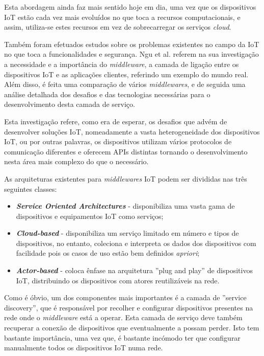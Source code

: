 Esta abordagem ainda faz mais sentido hoje em dia, uma vez que os dispositivos IoT estão cada vez mais evoluídos no que toca a recursos computacionais, e assim, utiliza-se estes recursos em vez de sobrecarregar os serviços \textit{cloud}.


Também foram efetuados estudos sobre os problemas existentes no campo da IoT no que toca a funcionalidades e segurança. Ngu et al. referem na sua investigação \cite{iot-survey-issues}a necessidade e a importância do \textit{middleware}, a camada de ligação entre os dispositivos IoT e as aplicações clientes, referindo um exemplo do mundo real. Além disso, é feita uma comparação de vários \textit{middlewares}, e de seguida uma análise detalhada dos desafios e das tecnologias necessárias para o desenvolvimento desta camada de serviço.

Esta investigação refere, como era de esperar, os desafios que advém de desenvolver soluções IoT, nomeadamente a vasta heterogeneidade dos dispositivos IoT, ou por outras palavras, os dispositivos utilizam vários protocolos de comunicação diferentes e oferecem APIs distintas tornando o desenvolvimento nesta área mais complexo do que o necessário.

As arquiteturas existentes para \textit{middlewares} IoT podem ser divididas nas três seguintes classes:
\begin{itemize}
\item \textbf{\textit{Service Oriented Architectures}} - disponibiliza uma vasta gama de dispositivos e equipamentos IoT como serviços;
\item \textbf{\textit{Cloud-based}} - disponibiliza um serviço limitado em número e tipos de dispositivos, no entanto, coleciona e interpreta os dados dos dispositivos com facilidade pois os casos de uso estão bem definidos \textit{apriori};
\item \textbf{\textit{Actor-based}} - coloca ênfase na arquitetura ''plug and play''  de dispositivos IoT, distribuindo os dispositivos com atores reutilizáveis na rede.
\end{itemize}

Como é óbvio, um dos componentes mais importantes é a camada de ''service discovery'', que é responsável por recolher e configurar dispositivos presentes na rede onde o \textit{middleware} está a operar. Esta camada de serviço deve também recuperar a conexão de dispositivos que eventualmente a possam perder. Isto tem bastante importância, uma vez que, é bastante incómodo ter que configurar manualmente todos os dispositivos IoT numa rede.

